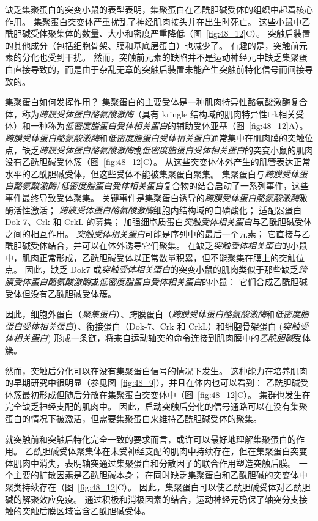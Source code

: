 缺乏集聚蛋白的突变小鼠的表型表明，集聚蛋白在乙酰胆碱受体的组织中起着核心作用。
集聚蛋白突变体严重扰乱了神经肌肉接头并在出生时死亡。
这些小鼠中乙酰胆碱受体聚集体的数量、大小和密度严重降低（图~\ref{fig:48_12}C）。
突触后装置的其他成分（包括细胞骨架、膜和基底层蛋白）也减少了。
有趣的是，突触前元素的分化也受到干扰。
然而，突触前元素的缺陷并不是运动神经元中缺乏集聚蛋白直接导致的，而是由于杂乱无章的突触后装置未能产生突触前特化信号而间接导致的。


集聚蛋白如何发挥作用？
集聚蛋白的主要受体是一种肌肉特异性酪氨酸激酶复合体，称为\textit{跨膜受体蛋白酪氨酸激酶}（具有 kringle 结构域的肌肉特异性trk相关受体）和一种称为\textit{低密度脂蛋白受体相关蛋白}的辅助受体亚基（图~\ref{fig:48_12}A）。
\textit{跨膜受体蛋白酪氨酸激酶}和\textit{低密度脂蛋白受体相关蛋白}通常集中在肌肉膜的突触位点，缺乏\textit{跨膜受体蛋白酪氨酸激酶}或\textit{低密度脂蛋白受体相关蛋白}的突变小鼠的肌肉没有乙酰胆碱受体簇（图~\ref{fig:48_12}C）。
从这些突变体体外产生的肌管表达正常水平的乙酰胆碱受体，但这些受体不能被集聚蛋白聚集。
集聚蛋白与\textit{跨膜受体蛋白酪氨酸激酶}/\textit{低密度脂蛋白受体相关蛋白}复合物的结合启动了一系列事件，这些事件最终导致受体聚集。
关键事件是集聚蛋白诱导的\textit{跨膜受体蛋白酪氨酸激酶}激酶活性激活；
\textit{跨膜受体蛋白酪氨酸激酶}细胞内结构域的自磷酸化；
适配器蛋白 Dok-7、Crk 和 CrkL 的募集；
加强细胞质蛋白\textit{突触受体相关蛋白}与乙酰胆碱受体之间的相互作用。
\textit{突触受体相关蛋白}可能是序列中的最后一个元素；
它直接与乙酰胆碱受体结合，并可以在体外诱导它们聚集。
在缺乏\textit{突触受体相关蛋白}的小鼠中，肌肉正常形成，乙酰胆碱受体以正常数量积累，但不能聚集在膜上的突触位点。
因此，缺乏 Dok7 或\textit{突触受体相关蛋白}的突变小鼠的肌肉类似于那些缺乏\textit{跨膜受体蛋白酪氨酸激酶}或\textit{低密度脂蛋白受体相关蛋白}的小鼠：
它们合成乙酰胆碱受体但没有乙酰胆碱受体簇。


因此，细胞外蛋白（\textit{聚集蛋白}）、跨膜蛋白（\textit{跨膜受体蛋白酪氨酸激酶}和\textit{低密度脂蛋白受体相关蛋白}）、衔接蛋白（Dok-7、Crk 和 CrkL）和细胞骨架蛋白 (\textit{突触受体相关蛋白}) 形成一条链，将来自运动轴突的命令连接到肌肉膜中的\textit{乙酰胆碱}受体簇。


然而，突触后分化可以在没有集聚蛋白信号的情况下发生。
这种能力在培养肌肉的早期研究中很明显（参见图~\ref{fig:48_9}），并且在体内也可以看到：
乙酰胆碱受体簇最初形成但随后分散在集聚蛋白突变体中（图~\ref{fig:48_12}C）。
集群也发生在完全缺乏神经支配的肌肉中。
因此，启动突触后分化的信号通路可以在没有集聚蛋白的情况下被激活，但需要集聚蛋白来维持乙酰胆碱受体的聚集。


就突触前和突触后特化完全一致的要求而言，或许可以最好地理解集聚蛋白的作用。
乙酰胆碱受体聚集体在未受神经支配的肌肉中持续存在，但在集聚蛋白突变体肌肉中消失，表明轴突通过集聚蛋白和分散因子的联合作用塑造突触后膜。
一个主要的扩散因素是乙酰胆碱本身；
在同时缺乏集聚蛋白和乙酰胆碱的突变体中聚类持续存在（图~\ref{fig:48_12}C）。
因此，集聚蛋白可以使乙酰胆碱受体对乙酰胆碱的解聚效应免疫。
通过积极和消极因素的结合，运动神经元确保了轴突分支接触的突触后膜区域富含乙酰胆碱受体。



